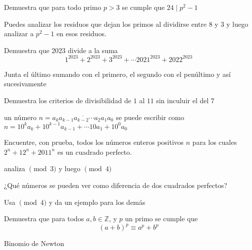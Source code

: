 \documentclass[11pt]{scrartcl}
\begin{document}
\begin{problem}
Demuestra que para todo primo $p>3$ se cumple que $24\mid p^2-1$
    \begin{hint}
        Puedes analizar los residuos que dejan los primos al dividirse entre $8$ y $3$ y luego analizar a $p^2-1$ en esos residuos. 
    \end{hint}
\end{problem}
\vspace{0.1cm}
\begin{problem}
Demuestra que $2023$ divide a la suma
\[1^{2023}+2^{2023}+3^{2023}+\cdots 2021^{2023}+2022^{2023}\]
    \begin{hint}
        Junta el último sumando con el primero, el segundo con el penúltimo y así sucesivamente
    \end{hint}
\end{problem}
\vspace{0.1cm}
\begin{problem}
    Demuestra los criterios de divisibilidad de $1$ al $11$ sin inculuir el del $7$
    \begin{hint}
         un número $n=\overline{a_ka_{k-1}a_{k-2}\cdots a_2a_1a_0}$ se puede escribir como $n=10^{k}a_k+10^{k-1}a_{k-1}+\cdots 10a_1+10^{0}a_0$
    \end{hint}
\end{problem}
\vspace{0.1cm}
\begin{problem}
Encuentre, con prueba, todos los números enteros positivos $n$ para los cuales $2^n + 12^n + 2011^n$ es un cuadrado perfecto.
  \begin{hint}
  analiza $\pmod 3$ y luego $\pmod 4$
  \end{hint}
\end{problem}
\vspace{0.1cm}
\begin{problem}
    ¿Qué números se pueden ver como diferencia de dos cuadrados perfectos?
    \begin{hint}
        Usa $\pmod 4$ y da un ejemplo para los demás
    \end{hint}
\end{problem}
\vspace{0.1cm}
\begin{problem}
    Demuestra que para todos $a,b\in \mathbb{Z}$, y $p$ un primo se cumple que 
    \[(a+b)^p\equiv a^p+b^p\]
    \begin{hint}
        Binomio de Newton
    \end{hint}
\end{problem}
\end{document}
